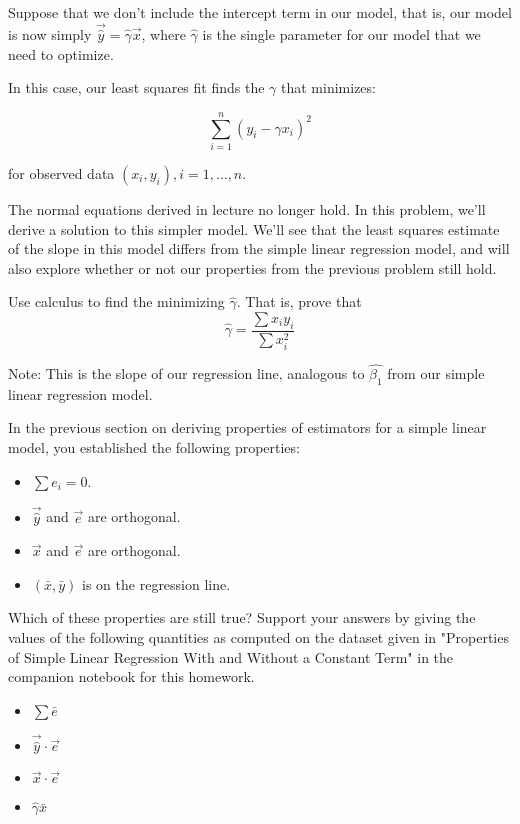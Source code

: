 \documentclass[addpoints, 12pt]{exam}
\begin{document}
\begin{questions}

Suppose that we don't include the intercept term in
our model, that is, our model is now simply $\vec{\hat{y}} = \hat{\gamma}\vec{x}$, where $\hat{\gamma}$ is the single parameter for our model that we need to optimize.

In this case, our least squares fit finds the $\gamma$ that minimizes: 

$$\sum_{i=1}^n (y_i - \gamma x_i)^2$$

for observed data $(x_i, y_i), i = 1, \ldots, n$.

The normal equations derived in lecture no longer hold. In this problem, we'll derive a solution to this simpler model. We'll see that the least squares estimate of the slope in this model differs from the simple linear regression model, and will also explore whether or not our properties from the previous problem still hold.

\question Use calculus to find the minimizing $\hat{\gamma}$.
That is, prove that 
$$ \hat{\gamma} = \frac{\sum x_iy_i}{\sum x_i^2}$$

Note: This is the slope of our regression line, analogous to $\hat{\beta_1}$ from our simple linear regression model.


\question In the previous section on deriving properties
of estimators for a simple linear model, you established the
following properties:

\begin{itemize}
    \item $\sum e_i = 0$.
    \item $\vec{\hat{y}}$ and $\vec{e}$ are orthogonal.
    \item $\vec{x}$ and $\vec{e}$ are orthogonal.
    \item $(\bar{x}, \bar{y})$ is on the regression line.
\end{itemize}

Which of these properties are still true? Support your answers by giving the values of the following quantities as computed on the dataset given in "Properties of Simple Linear Regression With and Without a Constant Term" in the companion notebook for this homework.

\begin{itemize}
\item $\sum \bar{e}$
\item $\vec{\hat{y}} \cdot \vec{e}$
\item $\vec{x} \cdot \vec{e}$
\item $\hat{\gamma}\bar{x}$
\end{itemize}


\end{questions}
\end{document}
